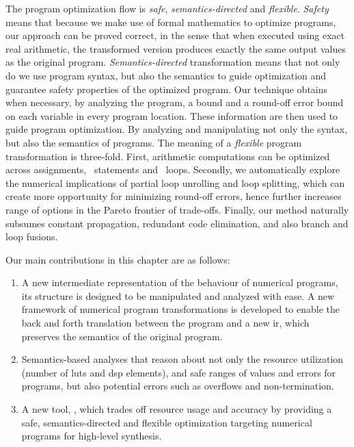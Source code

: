 The program optimization flow is \emph{safe}, \emph{semantics-directed} and
\emph{flexible}. \emph{Safety} means that because we make use of formal
mathematics to optimize programs, our approach can be proved correct, in
the sense that when executed using exact real arithmetic, the transformed
version produces exactly the same output values as the original program.
\emph{Semantics-directed} transformation means that not only do we use
program syntax, but also the semantics to guide optimization and guarantee
safety properties of the optimized program.  Our technique obtains when
necessary, by analyzing the program, a bound and a round-off error bound on
each variable in every program location.  These information are then used
to guide program optimization.  By analyzing and manipulating not only the
syntax, but also the semantics of programs.  The meaning of a \emph{flexible}
program transformation is three-fold.  First, arithmetic computations can be
optimized across assignments, \iflit~statements and \whilelit~loops.  Secondly,
we automatically explore the numerical implications of partial loop unrolling
and loop splitting, which can create more opportunity for minimizing round-off
errors, hence further increases range of options in the Pareto frontier of
trade-offs.  Finally, our method naturally subsumes constant propagation,
redundant code elimination, and also branch and loop fusions.


Our main contributions in this chapter are as follows:
\begin{enumerate}
    \vspace{-6pt}
    \item
        A new intermediate representation of the behaviour of numerical
        programs, its structure is designed to be manipulated and analyzed
        with ease.  A new framework of numerical program transformations is
        developed to enable the back and forth translation between the program
        and a new \gls{ir}, which preserves the semantics of the original
        program.
    \vspace{-6pt}
    \item
        Semantics-based analyses that reason about not only the resource
        utilization (number of \glspl{lut} and \gls{dsp} elements), and safe
        ranges of values and errors for programs, but also potential errors
        such as overflows and non-termination.
    \vspace{-6pt}
    \item
        A new tool, \newsoap, which trades off resource usage and accuracy
        by providing a safe, semantics-directed and flexible optimization
        targeting numerical programs for high-level synthesis.
    \vspace{-6pt}
\end{enumerate}

